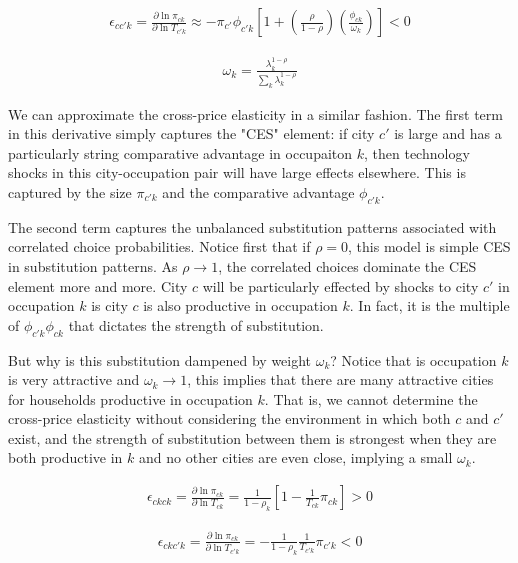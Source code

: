 \documentclass[10pt]{article}
\begin{document}
\begin{align}
    \epsilon_{cc'k} = \frac{\partial \ln \pi_{ck}}{\partial \ln T_{c'k}} \approx - \pi_{c'} \phi_{c'k} \left[ 1 + \left( \frac{\rho}{1 - \rho} \right) \left( \frac{\phi_{ck}}{\omega_k} \right) \right] < 0
\end{align}

\begin{align}
    \omega_k = \frac{\lambda_k^{1 - \rho}}{\sum_{k}^{} \lambda_k^{1 - \rho}}
\end{align}

We can approximate the cross-price elasticity in a similar fashion. The first term in this derivative simply captures the "CES" element: if city $c'$ is large and has a particularly string comparative advantage in occupaiton $k$, then technology shocks in this city-occupation pair will have large effects elsewhere. This is captured by the size $\pi_{c'k}$ and the comparative advantage $\phi_{c'k}$.

The second term captures the unbalanced substitution patterns associated with correlated choice probabilities. Notice first that if $\rho = 0$, this model is simple CES in substitution patterns. As $\rho \to 1$, the correlated choices dominate the CES element more and more. City $c$ will be particularly effected by shocks to city $c'$ in occupation $k$ is city $c$ is also productive in occupation $k$. In fact, it is the multiple of $\phi_{c'k} \phi_{ck}$ that dictates the strength of substitution.

But why is this substitution dampened by weight $\omega_k$? Notice that is occupation $k$ is very attractive and $\omega_k \to 1$, this implies that there are many attractive cities for households productive in occupation $k$. That is, we cannot determine the cross-price elasticity without considering the environment in which both $c$ and $c'$ exist, and the strength of substitution between them is strongest when they are both productive in $k$ and no other cities are even close, implying a small $\omega_k$.

\begin{align}
    \epsilon_{ckck} = \frac{\partial \ln \pi_{ck}}{\partial \ln T_{ck}} = \frac{1}{1 - \rho_k} \left[ 1 - \frac{1}{T_{ck}} \pi_{ck} \right] > 0
\end{align}

\begin{align}
    \epsilon_{ckc'k} = \frac{\partial \ln \pi_{ck}}{\partial \ln T_{c'k}} = - \frac{1}{1 - \rho_k} \frac{1}{T_{c'k}} \pi_{c'k} < 0
\end{align}
\end{document}
